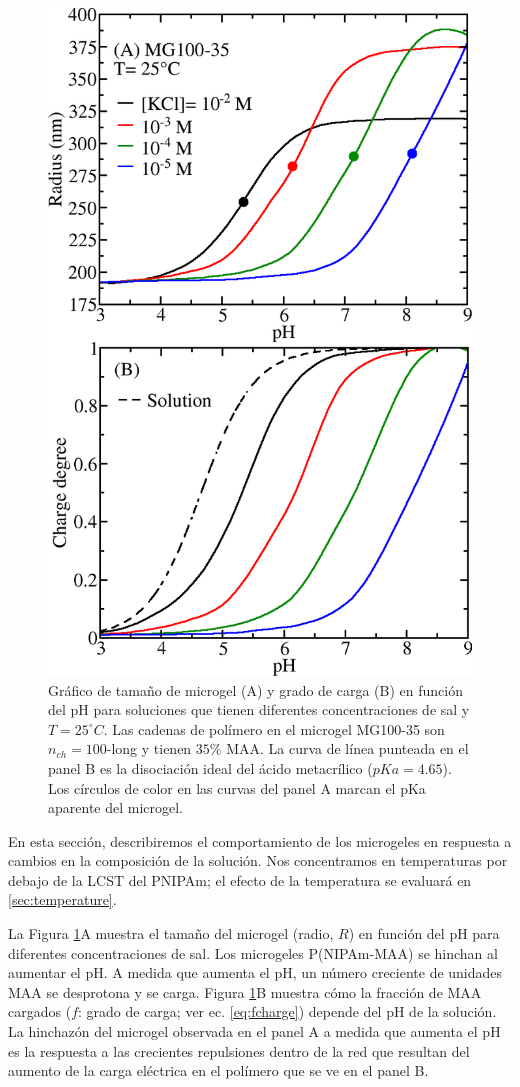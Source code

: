 \begin{figure}[!ht]
\centering
\includegraphics[width=0.5\linewidth]{Figures/graph-gel/R-pH.png}
\caption{Gr\'afico de tama\~no de microgel (A) y grado de carga (B) en funci\'on del pH para soluciones que tienen diferentes concentraciones de sal y $T=25 ^\circ C$.
	Las cadenas de pol\'imero en el microgel MG100-35 son $n_{ch}=100$-long y tienen $35\% $ MAA.
	La curva de línea punteada en el panel B es la disociaci\'on ideal del \'acido metacr\'ilico ($pKa=4.65$).
	Los c\'irculos de color en las curvas del panel A marcan el pKa aparente del microgel.}
\label{fig:R-pH}
\end{figure}

En esta secci\'on, describiremos el comportamiento de los microgeles en respuesta a cambios en la composici\'on de la soluci\'on.
Nos concentramos en temperaturas por debajo de la LCST del PNIPAm;
el efecto de la temperatura se evaluar\'a en \ref{sec:temperature}.


La Figura \ref{fig:R-pH}A muestra el tama\~no del microgel (radio, $R$) en funci\'on del pH para diferentes concentraciones de sal.
Los microgeles P(NIPAm-MAA) se hinchan al aumentar el pH.
A medida que aumenta el pH, un n\'umero creciente de unidades MAA se desprotona y se carga.
Figura \ref{fig:R-pH}B muestra c\'omo la fracci\'on de MAA cargados ($f$: grado de carga; ver ec. \ref{eq:fcharge}) depende del pH de la soluci\'on.
La hinchaz\'on del microgel observada en el panel A a medida que aumenta el pH es la respuesta a las crecientes repulsiones dentro de la red que resultan del aumento de la carga el\'ectrica en el pol\'imero que se ve en el panel B.



